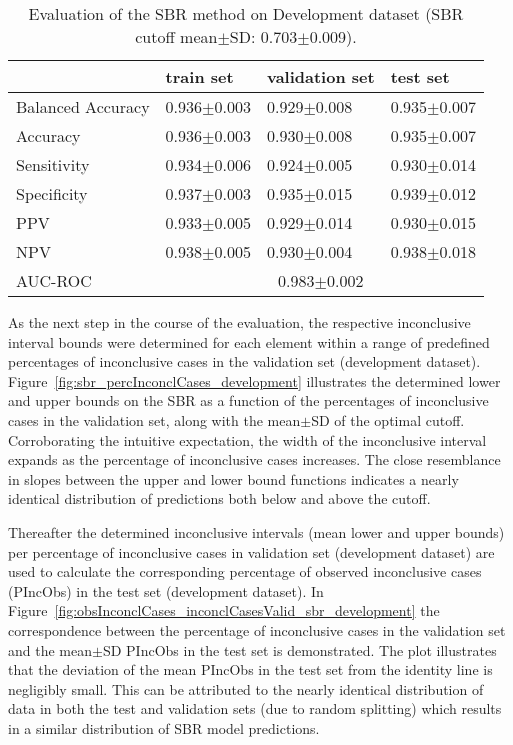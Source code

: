 \begin{table}[ht]
  \caption{Evaluation of the SBR method on Development dataset (SBR cutoff mean$\pm$SD: 0.703$\pm$0.009).}
  \centering
  \begin{tabular}{llll}
      \hline
                        & train set         & validation set      & test set             \\
      \hline
      Balanced Accuracy & 0.936$\pm$0.003   &   0.929$\pm$0.008   &  0.935$\pm$0.007     \\
      Accuracy          & 0.936$\pm$0.003   &   0.930$\pm$0.008   &  0.935$\pm$0.007     \\
      Sensitivity       &  0.934$\pm$0.006  &   0.924$\pm$0.005   &  0.930$\pm$0.014     \\
      Specificity       & 0.937$\pm$0.003   &   0.935$\pm$0.015   &  0.939$\pm$0.012     \\
      PPV               &  0.933$\pm$0.005  &   0.929$\pm$0.014   &  0.930$\pm$0.015     \\
      NPV               &  0.938$\pm$0.005  &   0.930$\pm$0.004   &  0.938$\pm$0.018     \\
      \hline
      AUC-ROC          &  \multicolumn{3}{c}{0.983$\pm$0.002 }  \\
      \hline
  \end{tabular}
 \label{t1:sbr_perf_eval_table}
\end{table}


As the next step in the course of the evaluation, 
the respective inconclusive interval bounds were determined 
for each element within a range of predefined percentages of inconclusive cases 
in the validation set (development dataset).
Figure~\ref{fig:sbr_percInconclCases_development} illustrates the determined lower and upper bounds on the SBR 
as a function of the percentages of inconclusive cases in the validation set, 
along with the mean$\pm$SD of the optimal cutoff.
Corroborating the intuitive expectation, the width of the inconclusive interval expands 
as the percentage of inconclusive cases increases.
The close resemblance in slopes between the upper and lower bound functions 
indicates a nearly identical distribution of predictions both below and above the cutoff.

Thereafter the determined inconclusive intervals (mean lower and upper bounds) per percentage of inconclusive cases 
in validation set (development dataset)
are used to calculate the corresponding percentage of observed inconclusive cases (PIncObs) in the test set (development dataset).
In Figure~\ref{fig:obsInconclCases_inconclCasesValid_sbr_development} the correspondence between 
the percentage of inconclusive cases in the validation set and 
the mean$\pm$SD PIncObs in the test set is demonstrated.
The plot illustrates that the deviation of the mean PIncObs in the test set from the 
identity line is negligibly small.
This can be attributed to the nearly identical distribution of data in both the test and validation sets 
(due to random splitting) which results in a similar distribution of SBR model predictions.


